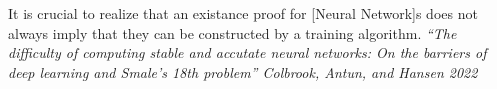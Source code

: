 \documentclass[convert=imagemagick, crop=true]{standalone}
\begin{document}
\parbox[t][72pt][c]{300pt}{
	It is crucial to realize that an existance proof for [Neural
	Network]s does not always imply that they can be constructed by a
	training algorithm.
\textit{``The difficulty of computing stable and accutate neural
	networks: On the barriers of deep learning and Smale's 18th
	problem'' Colbrook, Antun, and Hansen 2022}
}
\end{document}

